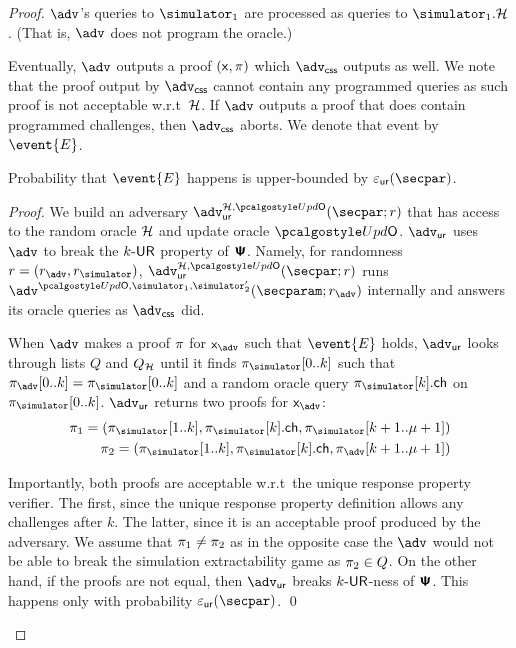 \begin{proof}
	$\advse$'s queries to $\simulator_1$ are processed as queries to $\simulator_1.\ro$. (That is, $\advse$ does not program the oracle.)

	Eventually, $\advse$ outputs a proof $(\mathsf{x}, \pi)$ which $\advcss$ outputs as well. We note that the proof output by $\advcss$ cannot contain any programmed queries as such proof is not acceptable w.r.t~$\mathcal{H}$. If $\advse$ outputs a proof that does contain programmed challenges, then $\advcss$ aborts. We denote that event by $\event{E}$.
	
	\begin{lemma}
		Probability that $\event{E}$ happens is upper-bounded by $\epsur(\secpar)$. 
	\end{lemma}
	\begin{proof}
	We build an adversary $\advur^{\ro, \initU} (\secpar; r)$ that has access to the random oracle $\mathcal{H}$ and update oracle $\initU$. $\advur$ uses $\advse$ to break the ${k\text{-}\mathsf{UR}}$ property of $\bm{\mathsf{\Psi}}$. Namely, for randomness $r = (r_{\advse}, \rsim)$, $\advur^{\ro, \initU} (\secpar; r)$ runs $\advse^{\initU, \simulator_1, \simulator_2'}(\secparam; r_{\advse})$ internally and answers its oracle queries as $\advcss$ did.

	When $\advse$ makes a proof $\pi$ for $\inp_{\advse}$ such that $\event{E}$ holds, $\advur$ looks through lists $Q$ and $Q_{\mathcal{H}}$ until it finds $\zkproofs[0..k]$ such that $\zkproof_{\advse}[0..k] = \zkproofs[0..k]$ and a random oracle query $\zkproofs[k].\ch$ on $\zkproofs[0..k]$.	$\advur$ returns two proofs for $\inp_{\advse}$:
		\begin{align*}
		\zkproof_1 = (\zkproofs[1..k],
		\zkproofs[k].\ch, \zkproofs[k + 1..\mu + 1])\\
		\zkproof_2 = (\zkproofs[1..k],
		\zkproofs[k].\ch, \zkproof_{\advse}[k + 1..\mu + 1])
		\end{align*}

	Importantly, both proofs are acceptable w.r.t~the unique response property verifier. The first, since the unique response property definition allows any challenges after $k$. The latter, since it is an acceptable proof produced by the adversary.
	We assume that $\pi_1 \neq \pi_2$ as in the opposite case the $\advse$ would not be able to break the simulation extractability game as $\pi_2 \in Q$. On the other hand, if the proofs are not equal, then $\advur$ breaks ${k\text{-}\mathsf{UR}}$-ness of $\bm{\mathsf{\Psi}}$. This happens only with  probability $\epsur(\secpar)$. 
	\qed
	\end{proof}


\end{proof}

